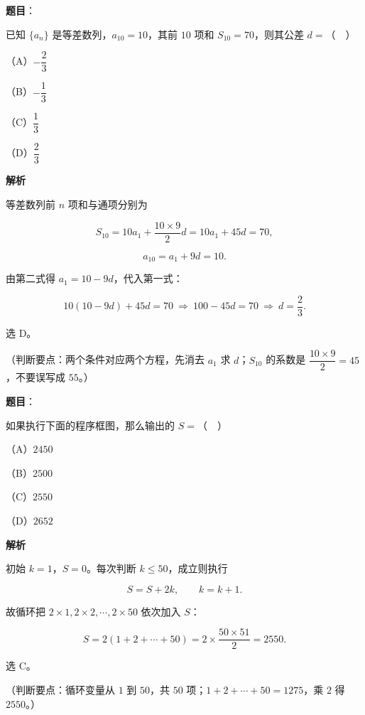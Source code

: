 \begin{answer}

\textbf{题目}：

已知 $\{a_n\}$ 是等差数列，$a_{10}=10$，其前 $10$ 项和 $S_{10}=70$，则其公差 $d=$（　）

（A）$-\dfrac23$

（B）$-\dfrac13$

（C）$\dfrac13$

（D）$\dfrac23$

\textbf{解析}

等差数列前 $n$ 项和与通项分别为

\nopagebreak[4]
\[S_{10}=10a_1+\frac{10\times9}{2}d=10a_1+45d=70,\]

\nopagebreak[4]
\[a_{10}=a_1+9d=10.\]

由第二式得 $a_1=10-9d$，代入第一式：

\nopagebreak[4]
\[10(10-9d)+45d=70\ \Rightarrow\ 100-45d=70\ \Rightarrow\ d=\frac23.\]

选 D。

（判断要点：两个条件对应两个方程，先消去 $a_1$ 求 $d$；$S_{10}$ 的系数是 $\dfrac{10\times9}{2}=45$，不要误写成 $55$。）


\end{answer}
\begin{answer}

\textbf{题目}：

如果执行下面的程序框图，那么输出的 $S=$（　）
\nopagebreak[4]
\begin{center}\end{center}
\nopagebreak[4]
（A）$2450$

（B）$2500$

（C）$2550$

（D）$2652$

\textbf{解析}

初始 $k=1$，$S=0$。每次判断 $k\leqslant50$，成立则执行

\nopagebreak[4]
\[S=S+2k,\qquad k=k+1.\]

故循环把 $2\times1,2\times2,\cdots,2\times50$ 依次加入 $S$：

\nopagebreak[4]
\[S=2(1+2+\cdots+50)=2\times\frac{50\times51}{2}=2550.\]

选 C。

（判断要点：循环变量从 $1$ 到 $50$，共 $50$ 项；$1+2+\cdots+50=1275$，乘 $2$ 得 $2550$。）


\end{answer}
